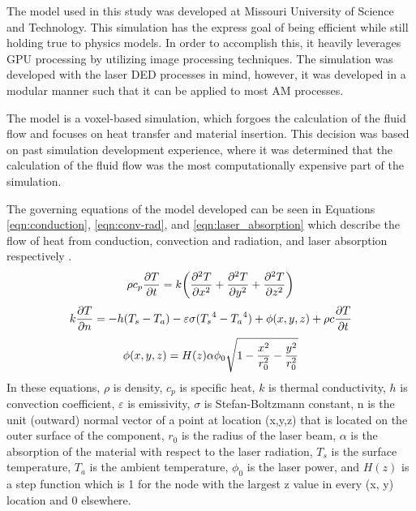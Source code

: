 \label{model_description}

The model used in this study was developed at Missouri University of Science and Technology.
This simulation has the express goal of being efficient while still holding true to physics models.  In order to accomplish this, it heavily leverages GPU processing by utilizing image processing techniques.  The simulation was developed with the laser \ac{DED} processes in mind, however, it was developed in a modular manner such that it can be applied to most \ac{AM} processes. 

The model is a voxel-based simulation, which forgoes the calculation of the fluid flow and focuses on heat transfer and material insertion.  This decision was based on past simulation development experience, where it was determined that the calculation of the fluid flow was the most computationally expensive part of the simulation.   

The governing equations of the model developed can be seen in Equations \ref{eqn:conduction}, \ref{eqn:conv-rad}, and \ref{eqn:laser_absorption} which describe the flow of heat from conduction, convection and radiation, and laser absorption respectively \cite{Han2012}.
	\begin{equation}
	\label{eqn:conduction}
	\centering
	\rho c_p \frac{\partial T}{\partial t}=k \left(\frac{\partial^2 T}{\partial x^2} +\frac{\partial^2 T}{\partial y^2}+\frac{\partial^2 T}{\partial z^2} \right)
	\end{equation}
		\begin{equation}
		\label{eqn:conv-rad}
		\centering
		k \frac{\partial T}{\partial n}=-h (T_s-T_a) - \varepsilon \sigma ({T_s}^4-{T_a}^4) + \phi(x, y, z) + \rho c \frac{\partial T}{\partial t}
		\end{equation}
			\begin{equation}
			\label{eqn:laser_absorption}
			\centering
			\phi(x,y,z) = H(z) \alpha \phi_0 \sqrt{1-\frac{x^2}{r_0^2} -\frac{y^2}{r_0^2}}
			\end{equation}
In these equations, $\rho$ is density, $c_p$ is specific heat, $k$ is thermal conductivity, $h$ is convection coefficient, $\varepsilon$ is emissivity, $\sigma$ is Stefan-Boltzmann constant, n is the unit (outward) normal vector of a point at location (x,y,z) that is located on the outer surface of the component, $r_0$ is the radius of the laser beam, $\alpha$ is the absorption of the material with respect to the laser radiation, $T_s$ is the surface temperature,
$T_a$ is the ambient temperature, $\phi_0$ is the laser power, and $H(z)$ is a step function which is 1 for the node with the largest z value in every (x, y) location and 0 elsewhere.



